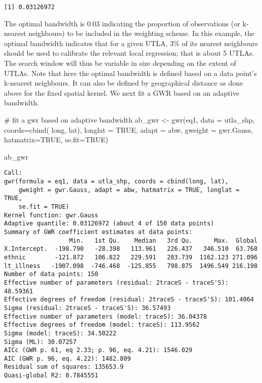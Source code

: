 \documentclass[
  letterpaper,
  krantz2]{style/krantz}
\newenvironment{Shaded}{\begin{snugshade}}{\end{snugshade}}
\newcommand{\AttributeTok}[1]{\textcolor[rgb]{0.40,0.45,0.13}{#1}}
\newcommand{\CommentTok}[1]{\textcolor[rgb]{0.37,0.37,0.37}{#1}}
\newcommand{\ConstantTok}[1]{\textcolor[rgb]{0.56,0.35,0.01}{#1}}
\newcommand{\FunctionTok}[1]{\textcolor[rgb]{0.28,0.35,0.67}{#1}}
\newcommand{\NormalTok}[1]{\textcolor[rgb]{0.00,0.23,0.31}{#1}}
\newcommand{\OtherTok}[1]{\textcolor[rgb]{0.00,0.23,0.31}{#1}}
\begin{document}
\begin{verbatim}
[1] 0.03126972
\end{verbatim}

The optimal bandwidth is 0.03 indicating the proportion of observations
(or k-nearest neighbours) to be included in the weighting scheme. In
this example, the optimal bandwidth indicates that for a given UTLA, 3\%
of its nearest neighbours should be used to calibrate the relevant local
regression; that is about 5 UTLAs. The search window will thus be
variable in size depending on the extent of UTLAs. Note that here the
optimal bandwidth is defined based on a data point's k-nearest
neighbours. It can also be defined by geographical distance as done
above for the fixed spatial kernel. We next fit a GWR based on an
adaptive bandwidth.

\begin{Shaded}
\begin{Highlighting}[]
\CommentTok{\# fit a gwr based on adaptive bandwidth}
\NormalTok{ab\_gwr }\OtherTok{\textless{}{-}} \FunctionTok{gwr}\NormalTok{(eq1, }
            \AttributeTok{data =}\NormalTok{ utla\_shp,}
            \AttributeTok{coords=}\FunctionTok{cbind}\NormalTok{( long, lat),}
            \AttributeTok{longlat =} \ConstantTok{TRUE}\NormalTok{,}
            \AttributeTok{adapt =}\NormalTok{ abw, }
            \AttributeTok{gweight =}\NormalTok{ gwr.Gauss,}
            \AttributeTok{hatmatrix=}\ConstantTok{TRUE}\NormalTok{, }
            \AttributeTok{se.fit=}\ConstantTok{TRUE}\NormalTok{)}

\NormalTok{ab\_gwr}
\end{Highlighting}
\end{Shaded}

\begin{verbatim}
Call:
gwr(formula = eq1, data = utla_shp, coords = cbind(long, lat), 
    gweight = gwr.Gauss, adapt = abw, hatmatrix = TRUE, longlat = TRUE, 
    se.fit = TRUE)
Kernel function: gwr.Gauss 
Adaptive quantile: 0.03126972 (about 4 of 150 data points)
Summary of GWR coefficient estimates at data points:
                  Min.   1st Qu.    Median   3rd Qu.      Max.  Global
X.Intercept.  -198.790   -28.398   113.961   226.437   346.510  63.768
ethnic        -121.872   106.822   229.591   283.739  1162.123 271.096
lt_illness   -1907.098  -746.468  -125.855   798.875  1496.549 216.198
Number of data points: 150 
Effective number of parameters (residual: 2traceS - traceS'S): 48.59361 
Effective degrees of freedom (residual: 2traceS - traceS'S): 101.4064 
Sigma (residual: 2traceS - traceS'S): 36.57493 
Effective number of parameters (model: traceS): 36.04378 
Effective degrees of freedom (model: traceS): 113.9562 
Sigma (model: traceS): 34.50222 
Sigma (ML): 30.07257 
AICc (GWR p. 61, eq 2.33; p. 96, eq. 4.21): 1546.029 
AIC (GWR p. 96, eq. 4.22): 1482.809 
Residual sum of squares: 135653.9 
Quasi-global R2: 0.7845551 
\end{verbatim}
\end{document}
